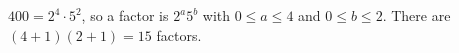 $400=2^4\cdot5^2$, so a factor is $2^a5^b$ with $0\le a\le4$ and $0\le b\le2$. There are $(4+1)(2+1)=\boxed{15}$ factors.
